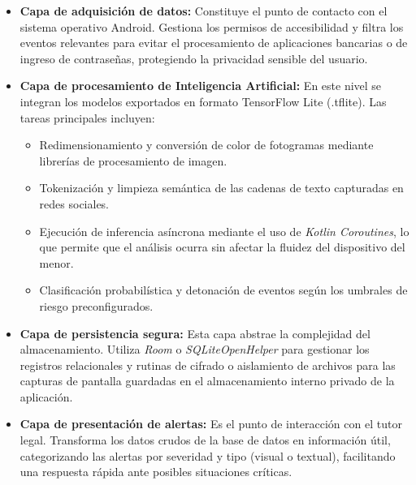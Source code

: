 \begin{itemize}
    \item \textbf{Capa de adquisición de datos:} Constituye el punto de contacto con el sistema operativo Android. Gestiona los permisos de accesibilidad y filtra los eventos relevantes para evitar el procesamiento de aplicaciones bancarias o de ingreso de contraseñas, protegiendo la privacidad sensible del usuario.\\
    \item \textbf{Capa de procesamiento de Inteligencia Artificial:} En este nivel se integran los modelos exportados en formato TensorFlow Lite (.tflite). Las tareas principales incluyen:\\
    \begin{itemize}
        \item Redimensionamiento y conversión de color de fotogramas mediante librerías de procesamiento de imagen.
        \item Tokenización y limpieza semántica de las cadenas de texto capturadas en redes sociales.
        \item Ejecución de inferencia asíncrona mediante el uso de \textit{Kotlin Coroutines}, lo que permite que el análisis ocurra sin afectar la fluidez del dispositivo del menor.
        \item Clasificación probabilística y detonación de eventos según los umbrales de riesgo preconfigurados.
    \end{itemize}
    \item \textbf{Capa de persistencia segura:} Esta capa abstrae la complejidad del almacenamiento. Utiliza \textit{Room} o \textit{SQLiteOpenHelper} para gestionar los registros relacionales y rutinas de cifrado o aislamiento de archivos para las capturas de pantalla guardadas en el almacenamiento interno privado de la aplicación.\\
    \item \textbf{Capa de presentación de alertas:} Es el punto de interacción con el tutor legal. Transforma los datos crudos de la base de datos en información útil, categorizando las alertas por severidad y tipo (visual o textual), facilitando una respuesta rápida ante posibles situaciones críticas.\\\\\\\\\\\\\\
\end{itemize}

